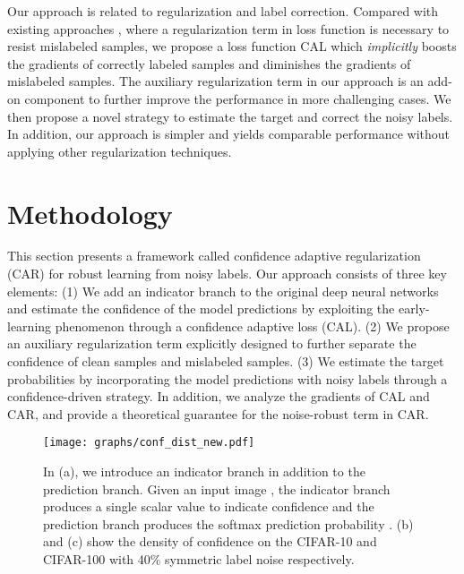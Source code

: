 \documentclass{article}
\begin{document}
Our approach is related to regularization and label correction. Compared with existing approaches \cite{hu2019simple,liu2020early}, where a regularization term in loss function is necessary to resist mislabeled samples, we propose a loss function CAL which \emph{implicitly} boosts the gradients of correctly labeled samples and diminishes the gradients of mislabeled samples. The auxiliary regularization term in our approach is an add-on component to further improve the performance in more challenging cases. We then propose a novel strategy to estimate the target and correct the noisy labels. In addition, our approach is simpler and yields comparable performance without applying other regularization techniques.
























 






\section{Methodology}
This section presents a framework called confidence adaptive regularization (CAR) for robust learning from noisy labels. Our approach consists of three key elements: (1) We add an indicator branch to the original deep neural networks and estimate the confidence of the model predictions by exploiting the early-learning phenomenon through a confidence adaptive loss (CAL). (2) We propose an auxiliary regularization term explicitly designed to further separate the confidence of clean samples and mislabeled samples. (3) We estimate the target probabilities by incorporating the model predictions with noisy labels through a confidence-driven strategy. In addition, we analyze the gradients of CAL and CAR, and provide a theoretical guarantee for the noise-robust term in CAR.

\begin{figure}[t]
	\begin{center}
		\texttt{[image: graphs/conf\_dist\_new.pdf]}
	\end{center}
	\caption{In (a), we introduce an indicator branch in addition to the prediction branch. Given an input image , the indicator branch produces a single scalar value  to indicate confidence and the prediction branch produces the softmax prediction probability . (b) and (c) show the density of confidence  on the CIFAR-10 and CIFAR-100 with 40\% symmetric label noise respectively.}
	\label{fig:framework}
	\vspace{-1em}
\end{figure}
\end{document}
